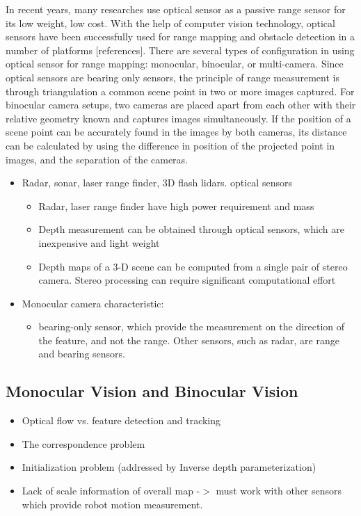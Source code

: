 In recent years, many researches use optical sensor as a passive range 
sensor for its low weight, low cost. With the help of computer vision 
technology, optical sensors have been successfully used for range 
mapping and obstacle detection in a number of platforms 
$[$references$]$. There are several types of configuration in using 
optical sensor for range mapping: monocular, binocular, or multi-camera. 
Since optical sensors are bearing only sensors, the principle of range 
measurement is through triangulation a common scene point in two or more 
images captured. For binocular camera setups, two cameras are placed 
apart from each other with their relative geometry known and captures 
images simultaneously. If the position of a scene point can be 
accurately found in the images by both cameras, its distance can be 
calculated by using the difference in position of the projected point in 
images, and the separation of the cameras. 

\begin{itemize}
  \item Radar, sonar, laser range finder, 3D flash lidars. optical sensors
  \begin{itemize}
    \item Radar, laser range finder have high power requirement and mass
    \item Depth measurement can be obtained through optical sensors, which 
    are inexpensive and light weight
    \item Depth maps of a 3-D scene can be computed from a single pair of 
    stereo camera. Stereo processing can require significant computational 
    effort
  \end{itemize}
  \item Monocular camera characteristic: 
  \begin{itemize}
    \item bearing-only sensor, which provide the measurement on the 
    direction of the feature, and not the range. Other sensors, such as 
    radar, are range and bearing sensors. 
  \end{itemize}
\end{itemize}

\subsection{Monocular Vision and Binocular Vision}\label{sec:MonoBino}
\begin{itemize}
  \item Optical flow vs. feature detection and tracking
  \item The correspondence problem
  \item Initialization problem (addressed by Inverse depth 
  parameterization)
  \item Lack of scale information of overall map -$>$ must work with other 
  sensors which provide robot motion measurement. 
\end{itemize}

